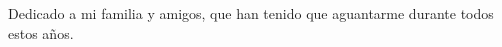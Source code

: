 \newpage
\bigskip
\bigskip
\begin{flushright}
  Dedicado a mi familia y amigos, que han tenido que aguantarme durante todos estos años.
\end{flushright}
